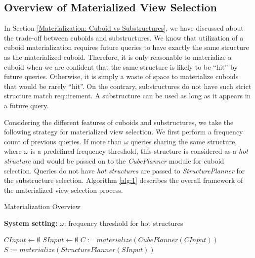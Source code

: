 \subsection{Overview of Materialized View Selection}
\label{Overview of Materialization Part}
In Section \ref{Materialization: Cuboid vs Substructures}, we have discussed about the trade-off between cuboids and substructures. We know that utilization of a cuboid materialization requires future queries to have exactly the same structure as the materialized cuboid. Therefore, it is only reasonable to materialize a cuboid %
when we are confident that the same structure is likely to be ``hit'' by future queries. Otherwise, it is simply a waste of space to materialize cuboids that would be rarely ``hit''. On the contrary, substructures do not have such strict structure match requirement. A substructure can be used as long as it appears in a future query.

Considering the different features of cuboids and substructures, we take the following strategy for materialized view selection.
We first perform a frequency count of previous queries. If more than $\omega$ queries sharing the same structure, where $\omega$ is a predefined frequency threshold, this structure is considered as a \emph{hot structure} and would be passed on to the \emph{CubePlanner} module for cuboid selection. Queries do not have \emph{hot structures} are passed to \emph{StructurePlanner} for the substructure selection. Algorithm \ref{alg:1} describes the overall framework of the materialized view selection process.

\begin{algorithm}[H]
	\label{alg:1}
	\caption{Materialization Overview}
	\LinesNumbered
	\textbf{System setting:} $\omega$: frequency threshold for hot structures\\
	
	$CInput \gets \emptyset$\;
	$SInput \gets \emptyset$\;
	$C:=materialize(CubePlanner(CInput))$\;
	$S:=materialize(StructurePlanner(SInput))$\;
	\label{alg:PartialMaterialization}
\end{algorithm}

